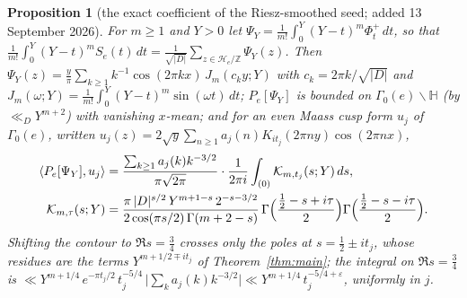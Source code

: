 \documentclass[11pt,a4paper]{article}
\newtheorem{proposition}[theorem]{Proposition}
\theoremstyle{remark}\newtheorem{remark}[theorem]{Remark}
\newcommand{\Z}{\mathbb Z}\newcommand{\R}{\mathbb R}\newcommand{\Q}{\mathbb Q}\newcommand{\C}{\mathbb C}
\begin{document}
\begin{proposition}[the exact coefficient of the Riesz-smoothed seed; added 13 September 2026]\label{prop:exact}
For $m\ge1$ and $Y>0$ let $\Psi_Y=\frac1{m!}\int_0^Y(Y-t)^m\Phi^+_t\,dt$, so that
$\frac1{m!}\int_0^Y(Y-t)^mS_e(t)\,dt=\frac1{\sqrt{|D|}}\sum_{z\in\mathcal H_e/\Z}\Psi_Y(z)$. Then
$\Psi_Y(z)=\frac y\pi\sum_{k\ge1}k^{-1}\cos(2\pi kx)\,J_m(c_ky;Y)$ with $c_k=2\pi k/\sqrt{|D|}$ and
$J_m(\omega;Y)=\frac1{m!}\int_0^Y(Y-t)^m\sin(\omega t)\,dt$; $P_e[\Psi_Y]$ is bounded on $\Gamma_0(e)\backslash\mathbb H$ (by
$\ll_DY^{m+2}$) with vanishing $x$-mean; and for an even Maass cusp form $u_j$ of $\Gamma_0(e)$, written
$u_j(z)=2\sqrt y\sum_{n\ge1}a_j(n)K_{it_j}(2\pi ny)\cos(2\pi nx)$,
\[
\begin{aligned}
\langle P_e[\Psi_Y],u_j\rangle&=\frac{\sum_{k\ge1}a_j(k)k^{-3/2}}{\pi\sqrt{2\pi}}\cdot\frac1{2\pi i}\int_{(0)}\mathcal K_{m,t_j}(s;Y)\,ds,\\
\mathcal K_{m,\tau}(s;Y)&=\frac{\pi\,|D|^{s/2}\,Y^{m+1-s}\,2^{-s-3/2}}{2\cos(\pi s/2)\,\Gamma(m+2-s)}\,
\Gamma\Bigl(\frac{\tfrac12-s+i\tau}2\Bigr)\Gamma\Bigl(\frac{\tfrac12-s-i\tau}2\Bigr).
\end{aligned}
\]
Shifting the contour to $\Re s=\tfrac34$ crosses only the poles at $s=\tfrac12\pm it_j$, whose residues are the terms
$Y^{m+1/2\mp it_j}$ of Theorem~\ref{thm:main}; the integral on $\Re s=\tfrac34$ is
$\ll Y^{m+1/4}\,e^{-\pi t_j/2}\,t_j^{-5/4}\,\bigl|\sum_ka_j(k)k^{-3/2}\bigr|\ll Y^{m+1/4}\,t_j^{-5/4+\varepsilon}$, uniformly in $j$.
\end{proposition}
\end{document}

